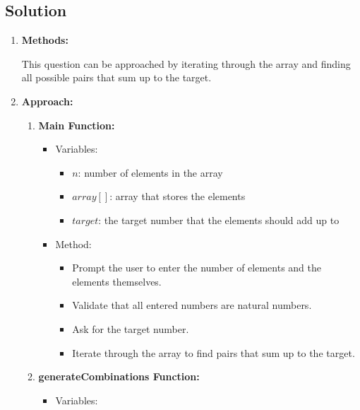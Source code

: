 \subsection{Solution}
\begin{enumerate}
    \item \textbf{Methods:}
    
    This question can be approached by iterating through the array and finding all possible pairs that sum up to the target.
    
    \item \textbf{Approach:}
    
    \begin{enumerate}
        \item \textbf{Main Function:}
        
        \begin{itemize}
            \item Variables:
            
            \begin{itemize}
                \item \(n\): number of elements in the array
                \item \(array[]\): array that stores the elements
                \item \(target\): the target number that the elements should add up to
            \end{itemize}
            
            \item Method:
            
            \begin{itemize}
                \item Prompt the user to enter the number of elements and the elements themselves.
                \item Validate that all entered numbers are natural numbers.
                \item Ask for the target number.
                \item Iterate through the array to find pairs that sum up to the target.
            \end{itemize}
        \end{itemize}
        
        \item \textbf{generateCombinations Function:}
        
        \begin{itemize}
            \item Variables:
            

\end{itemize}
\end{enumerate}
\end{enumerate}

